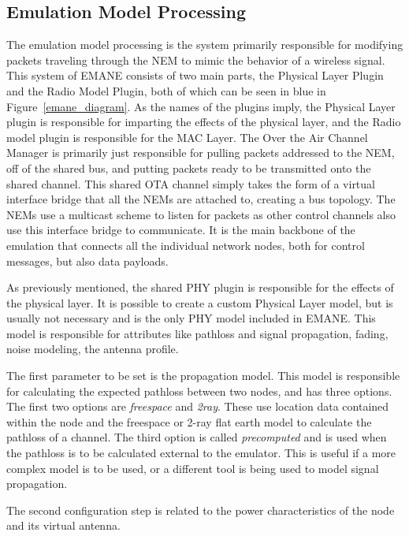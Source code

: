 \subsection{Emulation Model Processing}
The emulation model processing is the system primarily responsible for modifying packets traveling through the NEM to mimic the behavior of a wireless signal.
This system of EMANE consists of two main parts, the Physical Layer Plugin and the Radio Model Plugin, both of which can be seen in blue in Figure~\ref{emane_diagram}.
As the names of the plugins imply, the Physical Layer plugin is responsible for imparting the effects of the physical layer, and the Radio model plugin is responsible for the MAC Layer.
The Over the Air Channel Manager is primarily just responsible for pulling packets addressed to the NEM, off of the shared bus, and putting packets ready to be transmitted onto the shared channel.
This shared OTA channel simply takes the form of a virtual interface bridge that all the NEMs are attached to, creating a bus topology.
The NEMs use a multicast scheme to listen for packets as other control channels also use this interface bridge to communicate.
It is the main backbone of the emulation that connects all the individual network nodes, both for control messages, but also data payloads.\par
As previously mentioned, the shared PHY plugin is responsible for the effects of the physical layer.
It is possible to create a custom Physical Layer model, but is usually not necessary and is the only PHY model included in EMANE.
This model is responsible for attributes like pathloss and signal propagation, fading, noise modeling, the antenna profile.\par
The first parameter to be set is the propagation model.
This model is responsible for calculating the expected pathloss between two nodes, and has three options.
The first two options are \textit{freespace} and \textit{2ray}.
These use location data contained within the node and the freespace or 2-ray flat earth model to calculate the pathloss of a channel.
The third option is called \textit{precomputed} and is used when the pathloss is to be calculated external to the emulator.
This is useful if a more complex model is to be used, or a different tool is being used to model signal propagation.\par
The second configuration step is related to the power characteristics of the node and its virtual antenna.
